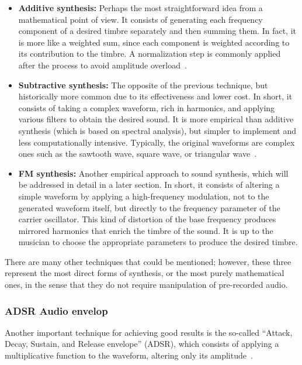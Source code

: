 \begin{itemize}
    \item \textbf{Additive synthesis:} Perhaps the most straightforward idea from a mathematical point of view. It consists of generating each frequency component of a desired timbre separately and then summing them. In fact, it is more like a weighted sum, since each component is weighted according to its contribution to the timbre. A normalization step is commonly applied after the process to avoid amplitude overload~\cite{luke2021synthesis}.

    \item \textbf{Subtractive synthesis:} The opposite of the previous technique, but historically more common due to its effectiveness and lower cost. In short, it consists of taking a complex waveform, rich in harmonics, and applying various filters to obtain the desired sound. It is more empirical than additive synthesis (which is based on spectral analysis), but simpler to implement and less computationally intensive. Typically, the original waveforms are complex ones such as the sawtooth wave, square wave, or triangular wave~\cite{luke2021synthesis}.

    \item \textbf{FM synthesis:} Another empirical approach to sound synthesis, which will be addressed in detail in a later section. In short, it consists of altering a simple waveform by applying a high-frequency modulation, not to the generated waveform itself, but directly to the frequency parameter of the carrier oscillator. This kind of distortion of the base frequency produces mirrored harmonics that enrich the timbre of the sound. It is up to the musician to choose the appropriate parameters to produce the desired timbre.
\end{itemize}

There are many other techniques that could be mentioned; however, these three represent the most direct forms of synthesis, or the most purely mathematical ones, in the sense that they do not require manipulation of pre-recorded audio.

\subsubsection{ADSR Audio envelop}

Another important technique for achieving good results is the so-called “Attack, Decay, Sustain, and Release envelope” (ADSR), which consists of applying a multiplicative function to the waveform, altering only its amplitude~\cite{luke2021synthesis}.

